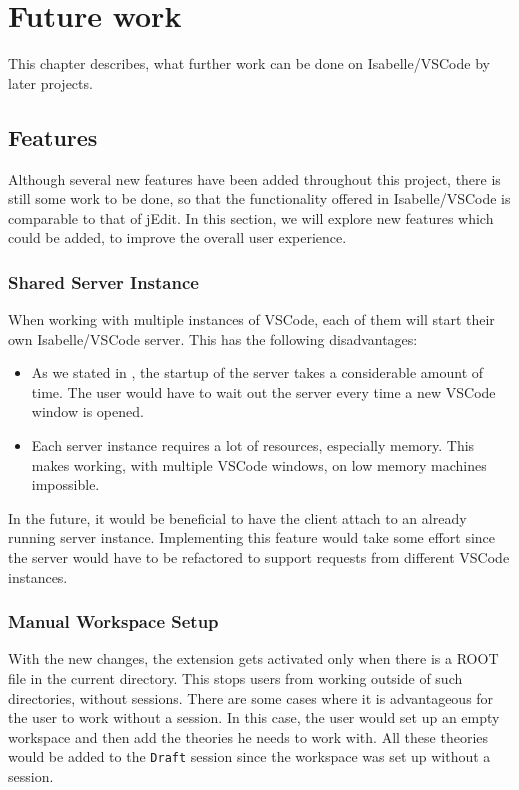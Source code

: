 
\chapter{Future work}
\label{chapter:future_work}
This chapter describes, what further work can be done on Isabelle/VSCode by later projects.

\section{Features}
Although several new features have been added throughout this project, there is still some work to be done, so that the functionality offered in Isabelle/VSCode is comparable to that of jEdit.  In this section, we will explore new features which could be added, to improve the overall user experience. 

\subsection{Shared Server Instance}
When working with multiple instances of VSCode, each of them will start their own Isabelle/VSCode server. This has the following disadvantages:
\begin{itemize}
    \item As we stated in , the startup of the server takes a considerable amount of time. The user would have to wait out the server every time a new VSCode window is opened.
    \item Each server instance requires a lot of resources, especially memory.  This makes working, with multiple VSCode windows, on low memory machines impossible. 
\end{itemize}

In the future, it would be beneficial to have the client attach to an already running server instance. Implementing this feature would take some effort since the server would have to be refactored to support requests from different VSCode instances.

\subsection{Manual Workspace Setup}
With the new changes, the extension gets activated only when there is a ROOT file in the current directory. This stops users from working outside of such directories, without sessions. There are some cases where it is advantageous for the user to work without a session. In this case, the user would set up an empty workspace and then add the theories he needs to work with. All these theories would be added to the \texttt{Draft} session since the workspace was set up without a session. 


